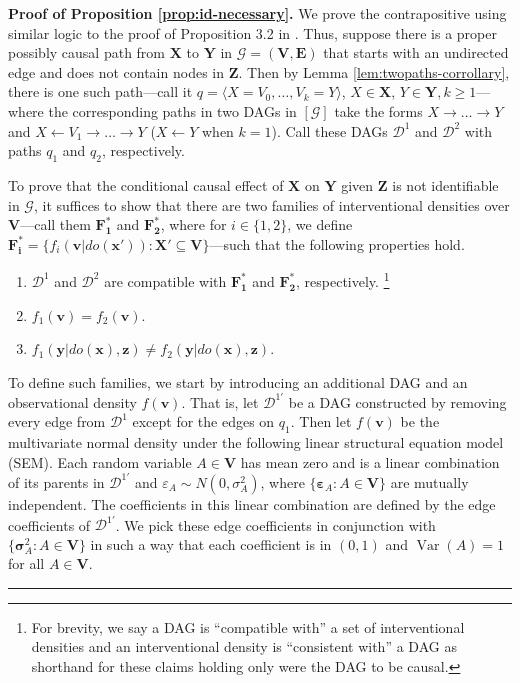 \documentclass[11pt]{article}
\DeclareMathOperator{\Var}{Var}
\newcommand{\BlackBox}{\rule{1.5ex}{1.5ex}}  %
\newcommand{\mb}[1]{\mathbf{#1}}
\newcommand{\g}[1][G]{\mathcal{#1}}
\newenvironment{proofof}[1][]{\noindent \textbf{Proof of #1.}}{\hfill\BlackBox}
\begin{document}
\begin{proofof}[Proposition \ref{prop:id-necessary}] 
    We prove the contrapositive using similar logic to the proof of Proposition 3.2 in \cite{perkovic2020identifying}. Thus, suppose there is a proper possibly causal path from $\mb{X}$ to $\mb{Y}$ in $\g = (\mb{V},\mb{E})$ that starts with an undirected edge and does not contain nodes in $\mb{Z}$. Then by Lemma \ref{lem:twopaths-corrollary}, there is one such path---call it $q=\langle X=V_0, \dots, V_k=Y\rangle$, $X \in \mb{X}$, $Y \in \mb{Y}, k \ge 1$---where the corresponding paths in two DAGs in $[\g]$ take the forms $X \to \dots \to Y$ and $X \gets V_1 \to \dots \to Y$ ($X \gets Y$ when $k=1$). Call these DAGs $\g[D]^1$ and $\g[D]^2$ with paths $q_1$ and $q_2$, respectively.

    To prove that the conditional causal effect of $\mb{X}$ on $\mb{Y}$ given $\mb{Z}$ is not identifiable in $\g$, it suffices to show that there are two families of interventional densities over $\mb{V}$---call them $\mb{F^*_1}$ and $\mb{F^*_2}$, where for $i \in \{1,2\}$, we define $\mb{F^*_i} = \{ f_i(\mb{v}|do(\mb{x'})) : \mb{X'} \subseteq \mb{V} \}$---such that the following properties hold. 
    \begin{enumerate}[label=(\roman*)]
        \item $\g[D]^1$ and $\g[D]^2$ are compatible with $\mb{F^*_1}$ and $\mb{F^*_2}$, respectively.
            \footnote{For brevity, we say a DAG is ``compatible with'' a set of interventional densities and an interventional density is ``consistent with'' a DAG as shorthand for these claims holding only were the DAG to be causal.}
            \label{prop:id-necessary-1}
        \item $f_1(\mb{v}) = f_2(\mb{v})$. \label{prop:id-necessary-2}
        \item $f_1(\mb{y} | do(\mb{x}), \mb{z}) \neq f_2(\mb{y} | do(\mb{x}), \mb{z})$. \label{prop:id-necessary-3}
    \end{enumerate}

    To define such families, we start by introducing an additional DAG and an observational density $f(\mb{v})$. That is, let $\g[D]^{1'}$ be a DAG constructed by removing every edge from $\g[D]^1$ except for the edges on $q_1$. Then let $f(\mb{v})$ be the multivariate normal density under the following linear structural equation model (SEM). Each random variable $A \in \mb{V}$ has mean zero and is a linear combination of its parents in $\g[D]^{1'}$ and $\varepsilon_{A} \sim N(0, \sigma^2_A)$, where $\{\mb{\varepsilon}_{A}: A \in \mb{V}\}$ are mutually independent. The coefficients in this linear combination are defined by the edge coefficients of $\g[D]^{1'}$. We pick these edge coefficients in conjunction with $\{\mb{\sigma}^2_{A}: A \in \mb{V}\}$ in such a way that each coefficient is in $(0,1)$ and $\Var(A) = 1$ for all $A \in \mb{V}$.


\end{proofof}
\end{document}

